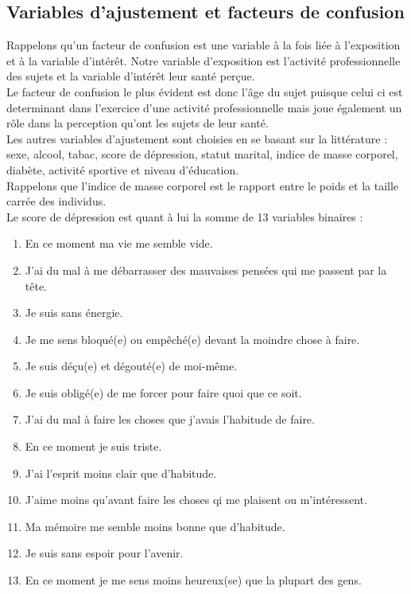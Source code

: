 \documentclass{book}
\begin{document}
\subsection{Variables d'ajustement et facteurs de confusion}
\noindent
Rappelons qu'un facteur de confusion est une variable à la fois liée à l'exposition et à la variable d'intérêt.
Notre variable d'exposition est l'activité professionnelle des sujets et la variable d'intérêt leur santé perçue.\\

\noindent
Le facteur de confusion le plus évident est donc l'âge du sujet puisque celui ci est determinant dans l'exercice d'une activité professionnelle mais joue également un rôle dans la perception qu'ont les sujets de leur santé.\\

\noindent
Les autres variables d'ajustement sont choisies en se basant sur la littérature : sexe, alcool, tabac, score de dépression, statut marital, indice de masse corporel, diabète, activité sportive et niveau d'éducation.\\


\noindent
Rappelons que l'indice de masse corporel est le rapport entre le poids et la taille carrée des individus. \\


\noindent
Le score de dépression est quant à lui la somme de 13 variables binaires :
\baselineskip 1pt
\begin{enumerate}
\item En ce moment ma vie me semble vide.
\item J'ai du mal à me débarrasser des mauvaises pensées qui me passent par la tête.
\item Je suis sans énergie.
\item Je me sens bloqué(e) ou empêché(e) devant la moindre chose à faire.
\item Je suis déçu(e) et dégouté(e) de moi-même.
\item Je suis obligé(e) de me forcer pour faire quoi que ce soit.
\item J'ai du mal à faire les choses que j'avais l'habitude de faire.
\item En ce moment je suis triste.
\item J'ai l'esprit moins clair que d'habitude.
\item J'aime moins qu'avant faire les choses qi me plaisent ou m'intéressent.
\item Ma mémoire me semble moins bonne que d'habitude.
\item Je suis sans espoir pour l'avenir.
\item En ce moment je me sens moins heureux(se) que la plupart des gens.
\end{enumerate}
\end{document}
